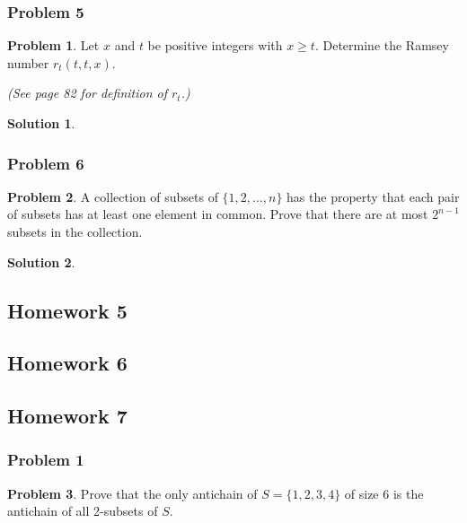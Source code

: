 \documentclass[10pt,a4paper,titlepage,twoside,draft]{article}
\theoremstyle{plain}
\theoremstyle{definition}
\newtheorem*{prob}{Problem}
\newtheorem*{sol}{Solution}
\theoremstyle{remark}
\begin{document}
\subsubsection{Problem 5}
  
\begin{prob}
Let $x$ and $t$ be positive integers with $x \geq t$. 
Determine the Ramsey number $r_t(t,t,x)$.

\emph{(See page 82 for definition of $r_t$.)}
\end{prob}

\medskip

\begin{sol}

\end{sol}


\subsubsection{Problem 6}

\begin{prob}
A collection of subsets of $\{1,2,\ldots,n\}$ has the property that each pair of subsets has at least one element in common. Prove that there are at most $2^{n-1}$ subsets in the collection.
\end{prob}

\medskip

\begin{sol}
\end{sol}


\subsection{Homework 5}

\subsection{Homework 6}

\subsection{Homework 7}

\subsubsection{Problem 1}

\begin{prob}
Prove that the only antichain of $S=\{1,2,3,4\}$ of size 6 is the antichain of all 2-subsets of $S$. 
\end{prob}
\end{document}

